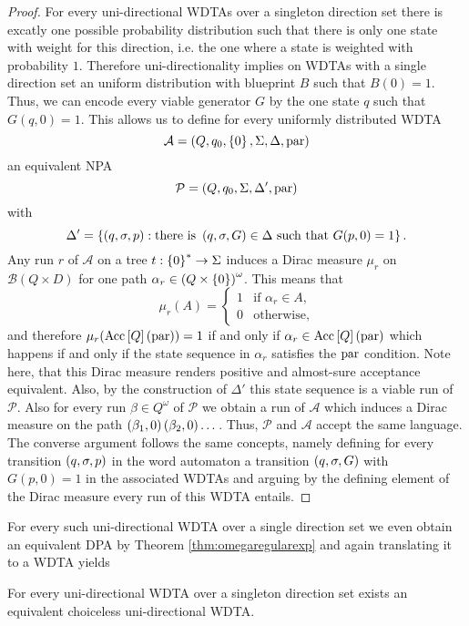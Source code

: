 \begin{proof}
  For every uni-directional \acp{WDTA} over a singleton direction set 
  there is excatly one possible probability distribution such that there is 
  only one state with weight for this direction, i.e. the one where a state is
  weighted with probability $1$. Therefore uni-directionality implies on 
  \acp{WDTA} with a single direction set an uniform distribution with blueprint
  $B$ such that $B(0) = 1$. Thus, we can encode every viable generator $G$ by 
  the one state $q$ such that $G(q,0) = 1$. This allows us to define for every 
  uniformly distributed \ac{WDTA}
  \begin{equation*}
    \mathcal{A} = \left(Q, q_{0}, \left\{0\right\}, \Sigma, \Delta, \operatorname{par}\right)
  \end{equation*}
  an equivalent \ac{NPA}
  \begin{equation*}
    \mathcal{P} = \left(Q, q_{0}, \Sigma, \Delta', \operatorname{par}\right)
  \end{equation*}
  with
  \begin{equation*}
    \Delta' = \left\{
      \left(q,\sigma,p\right): \text{there is }\left(q,\sigma,G\right)\in\Delta
        \text{ such that }G(p,0) = 1
    \right\}.
  \end{equation*}
  Any run $r$ of $\mathcal{A}$ on a tree $t:\left\{0\right\}^{*}\rightarrow\Sigma$ 
  induces a Dirac measure $\mu_{r}$ on $\mathcal{B}(Q\times D)$ for one path 
  $\alpha_{r}\in\left(Q\times \left\{0\right\}\right)^{\omega}$. This means that
  \begin{equation*}
    \mu_{r}(A) = \begin{cases}
      1&\text{if }\alpha_{r}\in A,\\
      0&\text{otherwise},
    \end{cases}
  \end{equation*}
  and therefore $\mu_{r}(\operatorname{Acc}\left[Q\right](\operatorname{par})) = 1$ if and only if
  $\alpha_{r}\in\operatorname{Acc}\left[Q\right](\operatorname{par})$ which happens if and only if the
  state sequence in $\alpha_{r}$ satisfies the $\operatorname{par}$ condition. Note here,
  that this Dirac measure renders positive and almost-sure acceptance 
  equivalent. Also, by the construction of $\Delta'$ this state sequence is a 
  viable run of $\mathcal{P}$. Also for every run $\beta\in Q^{\omega}$ of 
  $\mathcal{P}$ we obtain a run of $\mathcal{A}$ which induces a Dirac measure 
  on the path $\left(\beta_{1}, 0\right)\left(\beta_{2}, 0\right)\dots$. Thus, 
  $\mathcal{P}$ and $\mathcal{A}$ accept the same language. The converse 
  argument follows the same concepts, namely defining for every transition 
  $\left(q,\sigma, p\right)$ in the word automaton a transition $\left(q,\sigma,G\right)$ 
  with $G(p, 0) = 1$ in the associated \acp{WDTA} and arguing by the defining 
  element of the Dirac measure every run of this \ac{WDTA} entails.
\end{proof}
For every such uni-directional \ac{WDTA} over a single direction set we even 
obtain an equivalent \ac{DPA} by Theorem \ref{thm:omegaregularexp} and again
translating it to a \ac{WDTA} yields
\begin{corollary}
  For every uni-directional \ac{WDTA} over a singleton direction set exists
  an equivalent choiceless uni-directional \ac{WDTA}.
\end{corollary}

